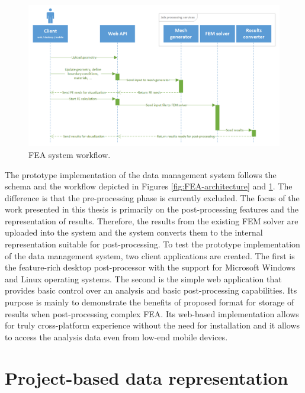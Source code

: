 \begin{figure}[H]
    \centering
    \includegraphics[width=\textwidth]{figures/FEA-workflow}
    \decoRule
    \caption{FEA system workflow.}
    \label{fig:FEA-workflow}
\end{figure}

The prototype implementation of the data management system follows the schema and the workflow depicted in Figures \ref{fig:FEA-architecture} and \ref{fig:FEA-workflow}. The difference is that the pre-processing phase is currently excluded. The focus of the work presented in this thesis is primarily on the post-processing features and the representation of results. Therefore, the results from the existing FEM solver are uploaded into the system and the system converts them to the internal representation suitable for post-processing. To test the prototype implementation of the data management system, two client applications are created. The first is the feature-rich desktop post-processor with the support for Microsoft Windows and Linux operating systems. The second is the simple web application that provides basic control over an analysis and basic post-processing capabilities. Its purpose is mainly to demonstrate the benefits of proposed format for storage of results when post-processing complex FEA. Its web-based implementation allows for truly cross-platform experience without the need for installation and it allows to access the analysis data even from low-end mobile devices.

\section{Project-based data representation} %
\label{sec:project-db-schema}

